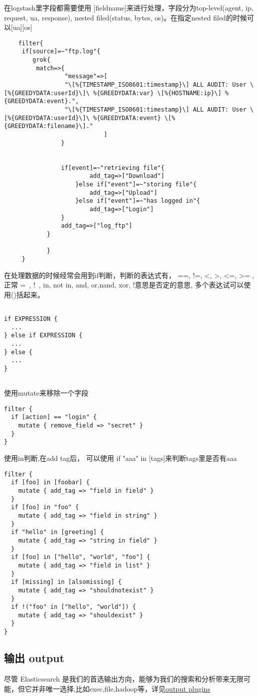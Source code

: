 在logstash里字段都需要使用 [fieldname]来进行处理，字段分为top-level(agent, ip, request, ua, response), nested filed(status, bytes, os)。在指定nested filed的时候可以[ua][os]
\begin{lstlisting}
	filter{
     if[source]=~"ftp.log"{
        grok{
         match=>{
                 "message"=>[
                 "\[%{TIMESTAMP_ISO8601:timestamp}\] ALL AUDIT: User \[%{GREEDYDATA:userId}\]\ %{GREEDYDATA:var} \[%{HOSTNAME:ip}\] %{GREEDYDATA:event}.",
                 "\[%{TIMESTAMP_ISO8601:timestamp}\] ALL AUDIT: User \[%{GREEDYDATA:userId}\]\ %{GREEDYDATA:event} \[%{GREEDYDATA:filename}\]."
							]
				}
				
				
				if[event]=~"retrieving file"{
						add_tag=>["Download"]
					}else if["event"]=~"storing file"{
						add_tag=>["Upload"]
					}else if["event"]=~"has logged in"{
						add_tag=>["Login"]			
				}
				add_tag=>["log_ftp"]
			}
			
			}
     }
\end{lstlisting}

在处理数据的时候经常会用到if判断，判断的表达式有， ==, !=, <, >, <=, >= ,正常 =~, !~, in, not in, and, or,nand, xor,   !意思是否定的意思, 多个表达试可以使用()括起来。
\begin{lstlisting}

if EXPRESSION {
  ...
} else if EXPRESSION {
  ...
} else {
  ...
}
	
\end{lstlisting}

使用mutate来移除一个字段
\begin{lstlisting}
filter {
  if [action] == "login" {
    mutate { remove_field => "secret" }
  }
}
\end{lstlisting}

使用in判断,在add tag后， 可以使用 if "aaa" in [tags]来判断tags里是否有aaa

\begin{lstlisting}
filter {
  if [foo] in [foobar] {
    mutate { add_tag => "field in field" }
  }
  if [foo] in "foo" {
    mutate { add_tag => "field in string" }
  }
  if "hello" in [greeting] {
    mutate { add_tag => "string in field" }
  }
  if [foo] in ["hello", "world", "foo"] {
    mutate { add_tag => "field in list" }
  }
  if [missing] in [alsomissing] {
    mutate { add_tag => "shouldnotexist" }
  }
  if !("foo" in ["hello", "world"]) {
    mutate { add_tag => "shouldexist" }
  }
}
\end{lstlisting}

\subsection{输出 output}
尽管 Elasticsearch 是我们的首选输出方向，能够为我们的搜索和分析带来无限可能，但它并非唯一选择,比如exec,file,hadoop等，详见\href{https://www.elastic.co/guide/en/logstash/current/output-plugins.html}{output plugins}


